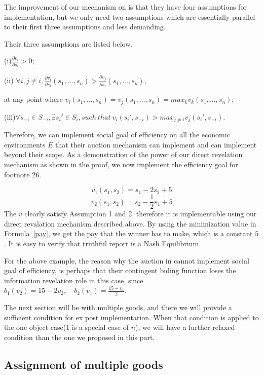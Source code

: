 The improvement of our mechanism on \parencite{Maskin00} is that they have four assumptions for implementation, but we only need two 
assumptions which are essentially parallel to their first three assumptions and less demanding. 

Their three assumptions are listed below.

(i)$\frac{\partial v_i}{\partial s_i} > 0$;

(ii) $\forall i, j \not = i, \frac{\partial v_i}{\partial s_i}(s_1,...,s_n)
> \frac{\partial v_j}{\partial s_i}(s_1,...,s_n)$,

at any point where $v_i(s_1,...,s_n) = v_j(s_1,...,s_n)= max_k v_k(s_1,...,s_n)$;

(iii)$ \forall s_{-i} \in S_{-i}, \exists s_i' \in S_i, such\ that\ v_i(s_i', s_{-i}) > max_{j\not=i}v_j(s_i', s_{-i})$.


Therefore, we can implement social
 goal of efficiency on all the economic  environments $E$ that their auction mechanism can implement and can implement beyond their
 scope. As a demonstration of the power of our direct revelation mechanism as shown in the proof, we now implement the efficiency 
 goal for \parencite{Maskin00} footnote 26.
 
\begin{example}
$$v_1(s_1,s_2)=s_1-2s_2+5$$
$$v_2(s_1,s_2)=s_2-\frac{1}{2}s_1+5$$
The $v$ clearly satisfy Assumption 1 and 2, therefore it is implementable using our direct revalation mechanism described above. By
using the minimization value in Formula~\ref{pay}, we get the pay that the winner has to make,  which is a constant $5$. It is easy to verify that truthful report is a Nash Equilibrium.
 
\end{example}
For the above example, the reason why the auction in \parencite{Maskin00} cannot implement social goal of efficiency, is perhaps that 
their contingent biding function loses the information revelation role in this case, since 
$b_1(v_2)=15-2v_2,\quad b_2(v_1)=\frac{15-v_1}{2}$.

The next section will be with multiple goods, and there we will provide a sufficient condition for ex post implementation. When that condition is applied to the one object case($1$ is a special case of $n$), we will have a further relaxed condition than the one we proposed in this part.
\subsection{Assignment of multiple goods}
\label{sec:assignment_of_multiple_goods}

